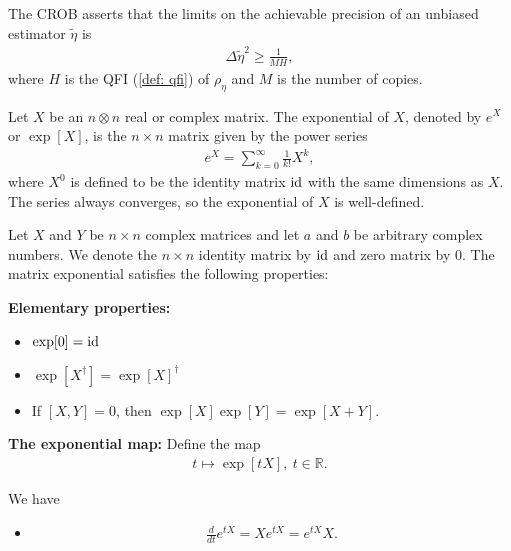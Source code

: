 \documentclass[../../note.tex]{subfiles}
\begin{document}
\begin{definition}
    \label{def: crob}
    The CROB asserts that the limits on the achievable precision of an unbiased estimator $\tilde{\eta}$ is
    \begin{align}
        \Delta \tilde{\eta}^2 \geq \frac{1}{MH},
    \end{align}
    where $H$ is the QFI (\ref{def: qfi}) of $\rho_{\eta}$ and $M$ is the number of copies. 
\end{definition}

\begin{theorem}
    \label{thm: cct}
    
\end{theorem}

\begin{definition}
    \label{def: matrix exponential}
    Let $X$ be an $n \otimes n$ real or complex matrix. The exponential of $X$, denoted by $e^X$ or $\exp[X]$, is the $n \times n$ matrix given by the power series
    \begin{align}
        e^X = \sum_{k=0}^{\infty} \frac{1}{k!} X^k,
    \end{align}
    where $X^0$ is defined to be the identity matrix $\operatorname{id}$ with the same dimensions as $X$. The series always converges, so the exponential of $X$ is well-defined.
\end{definition}

\begin{lemma}
    \label{lemma: properties of matrix exponential}
    Let $X$ and $Y$ be $n \times n$ complex matrices and let $a$ and $b$ be arbitrary complex numbers. We denote the $n \times n$ identity matrix by $\operatorname{id}$ and zero matrix by $0$. The matrix exponential satisfies the following properties:

    \textbf{Elementary properties:}
    \begin{itemize}
        \item $\exp[0] = \operatorname{id}$ \\
        \item $\exp[X^\dagger] = \exp[X]^\dagger$ \\
        \item If $[X, Y] = 0$, then $\exp[X] \exp[Y] = \exp[X + Y]$.
    \end{itemize}

    \textbf{The exponential map:}
    Define the map 
    \begin{align}
        t \mapsto \exp[t X],~ t \in \mathbb{R}.
    \end{align}

    We have
    \begin{itemize}
        \item \begin{align}
            \frac{d}{d t} e^{t X} = X e^{t X} = e^{t X} X.
        \end{align}
    \end{itemize}
\end{lemma}
\end{document}
